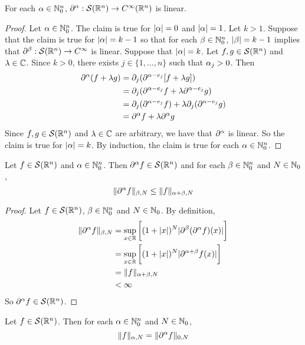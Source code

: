 \documentclass{book}
\begin{document}
	\begin{ex} 
		For each $\alpha \in \mathbb{N}_0^n$, $\partial^{\alpha}: \mathcal{S}(\mathbb{R}^n) \rightarrow C^{\infty}(\mathbb{R}^n)$ is linear. 
	\end{ex}
	
	\begin{proof}
		Let $\alpha \in \mathbb{N}_0^n$. The claim is true for $|\alpha| = 0$ and $|\alpha| = 1$. Let $k > 1$. Suppose that the claim is true for $|\alpha| = k-1$ so that for each $\beta \in \mathbb{N}_0^n$, $|\beta| = k-1$ implies that $\partial^{\beta}: \mathcal{S}(\mathbb{R}^n) \rightarrow C^{\infty}$ is linear. Suppose that $|\alpha| = k$. Let $f, g \in \mathcal{S}(\mathbb{R}^n)$ and $\lambda \in \mathbb{C}$. Since $k > 0$, there exists $j \in \{1, \ldots, n\}$ such that $\alpha_j > 0$. Then 
		\begin{align*}
			\partial^{\alpha}(f + \lambda g) 
			& = \partial_j(\partial^{\alpha - e_j} [f + \lambda g]) \\
			& =  \partial_j(\partial^{\alpha - e_j}f + \lambda \partial^{\alpha - e_j} g) \\
			& = \partial_j(\partial^{\alpha - e_j}f ) + \lambda \partial_j (\partial^{\alpha - e_j} g) \\
			& = \partial^{\alpha} f + \lambda \partial^{\alpha} g
		\end{align*} 
		Since $f, g \in \mathcal{S}(\mathbb{R}^n)$ and $\lambda \in \mathbb{C}$ are arbitrary, we have that $\partial^{\alpha}$ is linear. So the claim is true for $|\alpha| = k$. By induction, the claim is true for each $\alpha \in \mathbb{N}_0^n$.
	\end{proof}
	
	\begin{ex} 
		Let $f \in \mathcal{S}(\mathbb{R}^n)$ and $\alpha \in \mathbb{N}_0^n$. Then $\partial^{\alpha}f \in \mathcal{S}(\mathbb{R}^n)$ and for each $\beta \in \mathbb{N}_0^n$ and $N \in \mathbb{N}_0$, 
		$$\|\partial^{\alpha} f \|_{\beta, N} \leq \|f \|_{\alpha + \beta, N}$$ 
	\end{ex}
	
	\begin{proof}
		Let $f \in \mathcal{S}(\mathbb{R}^n)$, $\beta \in \mathbb{N}_0^n$ and $N \in \mathbb{N}_0$. By definition, 
		\begin{align*}
			\|\partial^{\alpha} f \|_{\beta, N}
			& = \sup_{x \in \mathbb{R}} \bigg[ (1 + |x|)^N |\partial^{\beta} (\partial^{\alpha} f) (x)| \bigg] \\
			&= \sup_{x \in \mathbb{R}} \bigg[ (1 + |x|)^N |\partial^{\alpha + \beta}f (x)| \bigg] \\
			& = \|f \|_{\alpha + \beta, N} \\
			& < \infty
		\end{align*}
		So $\partial^{\alpha}f \in \mathcal{S}(\mathbb{R}^n)$.
	\end{proof}
	
	\begin{ex} 
		Let $f \in \mathcal{S}(\mathbb{R}^n)$. Then for each $\alpha\in \mathbb{N}_0^n$ and $N \in \mathbb{N}_0$, 
		$$\|f\|_{\alpha, N} = \|\partial^{\alpha} f\|_{0, N}$$
	\end{ex}
	
\end{document}
